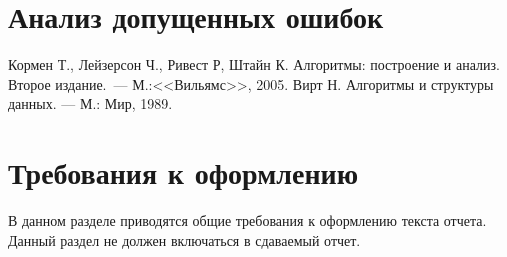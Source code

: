 \documentclass[a4paper,12pt,titlepage,final]{article}
\begin{document}
\newpage

\section{Анализ допущенных ошибок}


\newpage
\begin{raggedright}
\begin{thebibliography}{99}
 Кормен Т., Лейзерсон Ч., Ривест Р, Штайн К. Алгоритмы: построение и анализ.
    Второе издание.~--- М.:<<Вильямс>>, 2005.
 Вирт Н. Алгоритмы и структуры данных. — М.: Мир, 1989.
\end{thebibliography}
\end{raggedright}

\newpage

\section*{Требования к оформлению}

В данном разделе приводятся общие требования к оформлению текста отчета.
Данный раздел не должен включаться в сдаваемый отчет.
\end{document}
